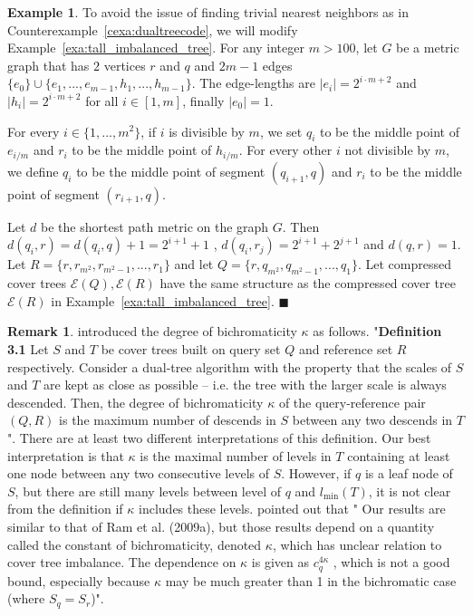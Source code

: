 \documentclass{vgtc}                          %
\numberwithin{algocf}{section}
\theoremstyle{definition}
\theoremstyle{definition}
\newtheorem{exa}[algocf]{Example}
\theoremstyle{definition}
\newtheorem{rem}[algocf]{Remark}
\theoremstyle{plain}
\newcommand{\T}{\mathcal{E}}
\newcommand{\bs}{\hfill $\blacksquare$}
\begin{document}
\begin{exa}
	\label{exa:dualtreeprooffaultyconst}
	To avoid the issue of finding trivial nearest neighbors as in Counterexample~\ref{cexa:dualtreecode}, we will modify Example~\ref{exa:tall_imbalanced_tree}. 
	For any integer $m > 100$, let $G$ be a metric graph that has $2$ vertices $r$ and $q$ and $2m-1$ edges $\{e_{0}\} \cup \{e_{1}, ..., e_{m-1},h_{1},..., h_{m-1}\}$.
	The edge-lengths are $|e_i| = 2^{i \cdot m+2}$ and $|h_i| = 2^{i \cdot m+2}$  for all $i \in [1,m]$, finally $|e_{0}| = 1$.
	
	\medskip
	\noindent
	For every $i \in \{1, ..., m^2\}$, if $i$ is divisible by $m$, we set $q_{i}$ to be the middle point of $e_{i / m}$ and $r_{i}$ to be the middle point of $h_{i / m}$. 
	For every other $i$ not divisible by $m$, we define $q_i$ to be the middle point of segment $(q_{i+1}, q)$ and $r_i$ to be the middle point of segment $(r_{i+1}, q)$.
	
	\medskip
	\noindent
	Let $d$ be the shortest path metric on the graph $G$. 
	Then $d(q_i,r) = d(q_i, q) + 1 = 2^{i+1} + 1$ , $d(q_i, r_j) = 2^{i+1} + 2^{j+1}$ and $d(q,r) = 1$. 
	Let $R = \{r, r_{m^2}, r_{m^2-1}, ..., r_1\}$ and let $Q = \{r,  q_{m^2}, q_{m^2-1}, ..., q_1 \}$. 
	Let compressed cover trees $\T(Q),\T(R)$ have the same structure as the compressed cover tree $\T(R)$ in Example~\ref{exa:tall_imbalanced_tree}.
	\bs
\end{exa}

\begin{rem}
	\label{rem:kappa}
	\cite[Definition~3.1]{ram2009linear} introduced the degree of bichromaticity $\kappa$ as follows. 
	\medskip
	\noindent
	"\textbf{Definition 3.1} Let $S$ and $T$ be cover trees built on query set $Q$ and reference set $R$ respectively.
	Consider a dual-tree algorithm with the property that the scales of $S$ and $T$ are kept as close as
	possible – i.e. the tree with the larger scale is always descended. Then, the degree of bichromaticity
	$\kappa$ of the query-reference pair $(Q, R)$ is the maximum number of descends in $S$ between any two
	descends in $T$".
	\medskip
	\noindent
	There are at least two different interpretations of this definition. Our best interpretation is that $\kappa$ is the maximal number of levels in $T$ containing at least one node between any two consecutive levels of $S$. However, if $q$ is a leaf node of $S$, but there are still many levels between level of $q$ and $l_{\min}(T)$, it is not clear from the definition if $\kappa$ includes these levels.
	\medskip
	\noindent
	\cite[page~3284]{curtin2015plug} pointed out that "
	Our results are similar to that of Ram et al. (2009a), but those results depend on a
	quantity called the constant of bichromaticity, denoted $\kappa$, which has unclear relation to
	cover tree imbalance. The dependence on $\kappa$ is given as $c_q^{4\kappa}$ , which is not a good bound,
	especially because $\kappa$ may be much greater than 1 in the bichromatic case (where $S_q = S_r$)".
\end{rem}
\end{document}
